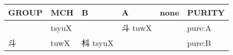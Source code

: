 \documentclass[14pt,a4paper]{scrartcl}
\begin{document}
\begin{longtable}[c]{@{}llllll@{}}
\toprule
\begin{minipage}[b]{0.14\columnwidth}\raggedright\strut
GROUP
\strut\end{minipage} &
\begin{minipage}[b]{0.14\columnwidth}\raggedright\strut
MCH
\strut\end{minipage} &
\begin{minipage}[b]{0.14\columnwidth}\raggedright\strut
B
\strut\end{minipage} &
\begin{minipage}[b]{0.14\columnwidth}\raggedright\strut
A
\strut\end{minipage} &
\begin{minipage}[b]{0.14\columnwidth}\raggedright\strut
none
\strut\end{minipage} &
\begin{minipage}[b]{0.14\columnwidth}\raggedright\strut
PURITY
\strut\end{minipage}\tabularnewline
\midrule
\endhead
\begin{minipage}[t]{0.14\columnwidth}\raggedright\strut
𣁬
\strut\end{minipage} &
\begin{minipage}[t]{0.14\columnwidth}\raggedright\strut
tsyuX
\strut\end{minipage} &
\begin{minipage}[t]{0.14\columnwidth}\raggedright\strut
\strut\end{minipage} &
\begin{minipage}[t]{0.14\columnwidth}\raggedright\strut
斗 tuwX
\strut\end{minipage} &
\begin{minipage}[t]{0.14\columnwidth}\raggedright\strut
\strut\end{minipage} &
\begin{minipage}[t]{0.14\columnwidth}\raggedright\strut
pure:A
\strut\end{minipage}\tabularnewline
\begin{minipage}[t]{0.14\columnwidth}\raggedright\strut
斗
\strut\end{minipage} &
\begin{minipage}[t]{0.14\columnwidth}\raggedright\strut
tuwX
\strut\end{minipage} &
\begin{minipage}[t]{0.14\columnwidth}\raggedright\strut
枓 tsyuX
\strut\end{minipage} &
\begin{minipage}[t]{0.14\columnwidth}\raggedright\strut
\strut\end{minipage} &
\begin{minipage}[t]{0.14\columnwidth}\raggedright\strut
\strut\end{minipage} &
\begin{minipage}[t]{0.14\columnwidth}\raggedright\strut
pure:B
\strut\end{minipage}\tabularnewline
\bottomrule
\end{longtable}
\end{document}
